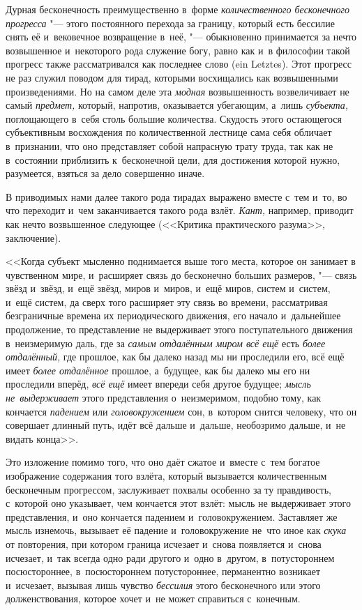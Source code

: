 
Дурная бесконечность преимущественно в~форме
{\em количественного бесконечного прогресса} "--- этого постоянного перехода за
границу, который есть бессилие снять её и~вековечное возвращение в~неё,
"--- обыкновенно принимается за нечто возвышенное и~некоторого рода служение
богу, равно как и~в философии такой прогресс также рассматривался как последнее
слово (ein Letz\-tes). Этот прогресс не раз служил поводом для тирад, которыми
восхищались как возвышенными произведениями. Но на самом деле эта {\em модная}
возвышенность возвеличивает не самый {\em предмет,} который, напротив,
оказывается убегающим, а~лишь {\em субъекта,} поглощающего в~себя столь большие
количества. Скудость этого остающегося субъективным восхождения по
количественной лестнице сама себя обличает в~признании, что оно представляет
собой напрасную трату труда, так как не в~состоянии приблизить к~бесконечной
цели, для достижения которой нужно, разумеется, взяться за дело совершенно
иначе.

В приводимых нами далее такого рода тирадах выражено вместе с~тем и~то, во что
переходит и~чем заканчивается такого рода взлёт. {\em Кант,} например, приводит
как нечто возвышенное следующее (<<Критика практического разума>>, заключение).

<<Когда субъект мысленно поднимается выше того места, которое он занимает в
чувственном мире, и~расширяет связь до бесконечно больших размеров, "--- связь
звёзд и~звёзд, и~ещё звёзд, миров и~миров, и~ещё миров, систем и~систем, и~ещё
систем, да сверх того расширяет эту связь во времени, рассматривая безграничные
времена их периодического движения, его начало и~дальнейшее продолжение, то
представление не выдерживает этого поступательного движения в~неизмеримую даль,
где за {\em самым отдалённым миром всё ещё} есть {\em более отдалённый,} где
прошлое, как бы далеко назад мы ни проследили его, всё ещё имеет
{\em более отдалённое} прошлое, а~будущее, как бы далеко мы его ни проследили
вперёд, {\em всё ещё} имеет впереди себя другое будущее;
{\em мысль не~выдерживает} этого представления о~неизмеримом, подобно тому, как
кончается {\em падением} или {\em головокружением} сон, в~котором снится
человеку, что он совершает длинный путь, идёт всё дальше и~дальше, необозримо
дальше, и~не видать конца>>.

Это изложение помимо того, что оно даёт сжатое и~вместе с~тем богатое
изображение содержания того взлёта, который вызывается количественным
бесконечным прогрессом, заслуживает похвалы особенно за ту правдивость,
с~которой оно указывает, чем кончается этот взлёт: мысль не выдерживает этого
представления, и~оно кончается падением и~головокружением. Заставляет же мысль
изнемочь, вызывает её падение и~головокружение не~что иное как {\em скука} от
повторения, при котором граница исчезает и~снова появляется и~снова исчезает,
и~так всегда одно ради другого и~одно в~другом, в~потустороннем посюстороннее,
в~посюстороннем потустороннее, перманентно возникает и~исчезает, вызывая лишь
чувство {\em бессилия} этого бесконечного или этого долженствования, которое
хочет и~не может справиться с~конечным.

